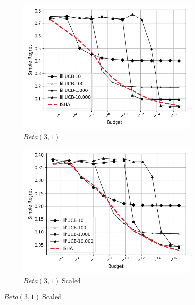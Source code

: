 \begin{figure}
\begin{subfigure}{0.4\textwidth}
	\includegraphics[width=\textwidth]{fixedbudget/figures/folder5/alpha1_beta3_unscaled.png}
	\caption{$Beta(3,1)$}
	\label{appendix:fig:sh-lilucb:alpha1_beta3_unscaled}
\end{subfigure}
\quad
\begin{subfigure}{0.4\textwidth}
	\includegraphics[width=\textwidth]{fixedbudget/figures/folder5/alpha1_beta3_scaled.png}
	\caption{$Beta(3,1)$ Scaled}
	\label{appendix:fig:sh-lilucb:alpha1_beta3_scaled}
\end{subfigure}
%
\label{appendix:fig:sh-lilucb}
\end{figure}



